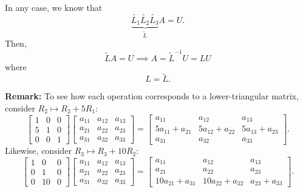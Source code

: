 \documentclass[letterpaper]{article}
\newcommand{\0}{\mathbf{0}}
\begin{document}
\begin{mdframed}
\begin{mdframed}
        
        In any case, we know that 
        \[\underbrace{\tilde{L_1} \tilde{L_2} \tilde{L_3}}_{\tilde{L}} A = U.\]
        Then,
        \[\tilde{L}A = U \implies A = \tilde{L}^{-1} U = LU\]
        where 
        \[L = \tilde{L}.\]
    \end{mdframed}
\end{mdframed}

\textbf{Remark:} To see how each operation corresponds to a lower-triangular matrix, consider $R_2 \mapsto R_2 + 5R_1$: 
\[\begin{bmatrix}
    1 & 0 & 0 \\ 
    5 & 1 & 0 \\ 
    0 & 0 & 1 
\end{bmatrix} \begin{bmatrix}
    a_{11} & a_{12} & a_{13} \\ 
    a_{21} & a_{22} & a_{23} \\ 
    a_{31} & a_{32} & a_{33}
\end{bmatrix} = \begin{bmatrix}
    a_{11} & a_{12} & a_{13} \\ 
    5a_{11} + a_{21} & 5a_{12} + a_{22} & 5a_{13} + a_{23} \\ 
    a_{31} & a_{32} & a_{33}
\end{bmatrix}.\]
Likewise, consider $R_3 \mapsto R_3 + 10R_2$:
\[\begin{bmatrix}
    1 & 0 & 0 \\ 
    0 & 1 & 0 \\ 
    0 & 10 & 0 
\end{bmatrix} \begin{bmatrix}
    a_{11} & a_{12} & a_{13} \\ 
    a_{21} & a_{22} & a_{23} \\ 
    a_{31} & a_{32} & a_{33}
\end{bmatrix} = \begin{bmatrix}
    a_{11} & a_{12} & a_{13} \\ 
    a_{21} & a_{22} & a_{23} \\ 
    10a_{21} + a_{31} & 10a_{22} + a_{32} & a_{23} + a_{33}
\end{bmatrix}.\]
\end{document}

